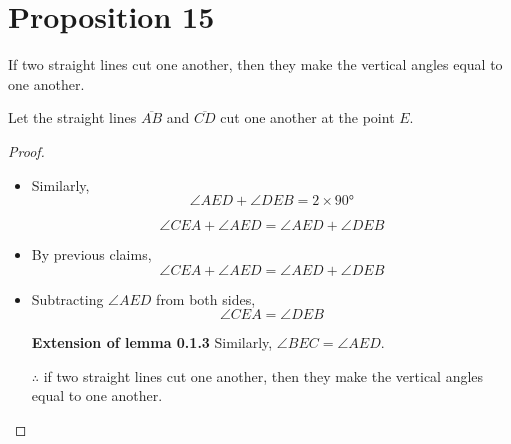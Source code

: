 \section*{Proposition 15}

\begin{thm}
If two straight lines cut one another, then they make the vertical angles equal to one another.
\end{thm}

\begin{figure}[H]
	\caption{}
\end{figure}

Let the straight lines $\overline{AB}$ and $\overline{CD}$ cut one another at the point $E$.

\begin{proof}

\begin{itemize}

\begin{lemma}
\[\angle{CEA} = \angle{DEB} \text{ and } \angle{BEC} = \angle{AED}\].Proof: By the angle sum property\[\angle{CEA} + \angle{AED} = 2\times\ang{90}\] \hfill\textcolor{red}{ I.13} 
\end{lemma}

\item Similarly,  
\[\angle{AED} + \angle{DEB} = 2\times\ang{90}\]

\clearpage

\begin{lemma}
\[\angle{CEA} + \angle{AED} = \angle{AED} + \angle{DEB}\]
\end{lemma}

\item By previous claims, 
\[\angle{CEA} + \angle{AED} = \angle{AED} + \angle{DEB}\] 

\item Subtracting  $\angle{AED}$ from both sides,
\[\angle{CEA} = \angle{DEB}\]


\textbf{Extension of lemma 0.1.3} Similarly, $\angle BEC = \angle AED$.

$\therefore$ if two straight lines cut one another, then they make the vertical angles equal to one another.

\end{itemize}

\end{proof}

\clearpage
